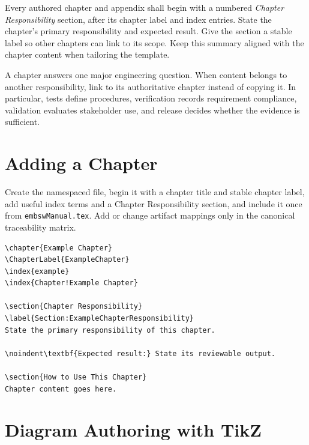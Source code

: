 Every authored chapter and appendix shall begin with a numbered
\textit{Chapter Responsibility} section, after its chapter label and index
entries. State the chapter's primary responsibility and expected result. Give
the section a stable label so other chapters can link to its scope. Keep this
summary aligned with the chapter content when tailoring the template.

A chapter answers one major engineering question. When content belongs
to another responsibility, link to its authoritative chapter instead of
copying it. In particular, tests define procedures, verification records
requirement compliance, validation evaluates stakeholder use, and release
decides whether the evidence is sufficient.

\section{Adding a Chapter}

Create the namespaced file, begin it with a chapter title and stable chapter
label, add useful index terms and a Chapter Responsibility section, and include it once from
\texttt{embswManual.tex}. Add or change artifact mappings only in the canonical
traceability matrix.

\begin{verbatim}
\chapter{Example Chapter}
\ChapterLabel{ExampleChapter}
\index{example}
\index{Chapter!Example Chapter}

\section{Chapter Responsibility}
\label{Section:ExampleChapterResponsibility}
State the primary responsibility of this chapter.

\noindent\textbf{Expected result:} State its reviewable output.

\section{How to Use This Chapter}
Chapter content goes here.
\end{verbatim}

\section{Diagram Authoring with TikZ}
\label{Section:TikZAuthoring}

